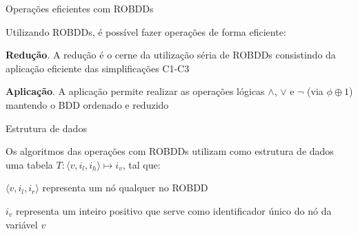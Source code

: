 \expandafter\documentclass\expandafter[table, usenames, svgnames, dvipsnames,14pt, \classopts]{beamer}
\begin{document}
\begin{frame}{Operações eficientes com ROBDDs}

    Utilizando ROBDDs, é possível fazer operações de forma eficiente:
    
    \begin{outline}
        \1 \textbf{Redução}. A redução é o cerne da utilização séria de ROBDDs
            \2[-] consistindo da aplicação eficiente das simplificações C1-C3
            
        \1 \textbf{Aplicação}. A aplicação permite realizar as operações lógicas $\land$, $\lor$ e $\lnot$ (via $\phi \oplus 1$)
            \2[-] mantendo o BDD ordenado e reduzido
    \end{outline}

\end{frame}

\begin{frame}{Estrutura de dados}

    Os algoritmos das operações com ROBDDs utilizam como estrutura de dados uma tabela $T: \langle v,i_l,i_h \rangle \mapsto i_v$, tal que:

    \small
    \begin{outline}
        \1 $\langle v,i_l,i_r \rangle$ representa um nó qualquer no ROBDD
            
        \vspace{1em}
            
        \1 $i_v$ representa um inteiro positivo que serve como identificador único do nó da variável $v$
    \end{outline}

\end{frame}
\end{document}
